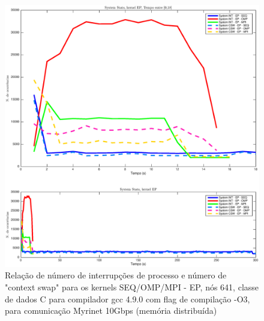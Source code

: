 \documentclass[conference,compsoc]{IEEEtran}
\begin{document}
\begin{figure}[H]
\centering
\includegraphics[width=1.1\columnwidth]{EPS/dstat_EP_seq_vs_omp_vs_mpi/system.eps}
\caption{Relação de número de interrupções de processo e número de "context swap" para os kernels SEQ/OMP/MPI - EP, nós 641, classe de dados C para compilador gcc 4.9.0 com flag de compilação  -O3, para comunicação Myrinet 10Gbps (memória distribuída)}
\label{dstat_ep_SOM_system}
\end{figure}
\end{document}
